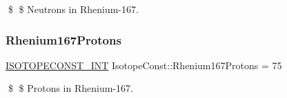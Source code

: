 \$ \$ Neutrons in Rhenium-\/167. \mbox{\label{group___isotope_const-_rhenium-_re167_ga49c573b9c4fdb76f0aa4b82e8be21de7}} 
\subsubsection{\texorpdfstring{Rhenium167\+Protons}{Rhenium167Protons}}
{\footnotesize\ttfamily \mbox{\hyperlink{group___isotope_const-_macros_ga5f18360b3e99483a35c32d789e62621c}{I\+S\+O\+T\+O\+P\+E\+C\+O\+N\+S\+T\+\_\+\+I\+NT}} Isotope\+Const\+::\+Rhenium167\+Protons = 75}

\$ \$ Protons in Rhenium-\/167. 